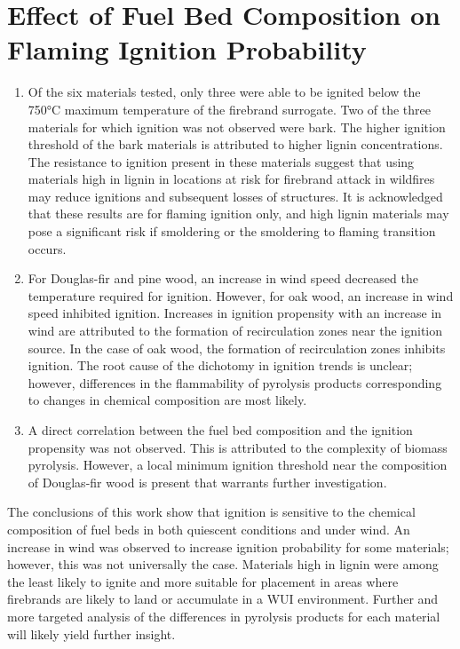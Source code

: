 \section{Effect of Fuel Bed Composition on Flaming Ignition Probability}
        \begin{enumerate}
            \item Of the six materials tested, only three were able to be ignited below the 750\si{\celsius} maximum temperature of the firebrand surrogate. Two of the three materials for which ignition was not observed were bark. The higher ignition threshold of the bark materials is attributed to higher lignin concentrations. The resistance to ignition present in these materials suggest that using materials high in lignin in locations at risk for firebrand attack in wildfires may reduce ignitions and subsequent losses of structures. It is acknowledged that these results are for flaming ignition only, and high lignin materials may pose a significant risk if smoldering or the smoldering to flaming transition occurs.
            
            \item For Douglas-fir and pine wood, an increase in wind speed decreased the temperature required for ignition. However, for oak wood, an increase in wind speed inhibited ignition. Increases in ignition propensity with an increase in wind are attributed to the formation of recirculation zones near the ignition source. In the case of oak wood, the formation of recirculation zones inhibits ignition. The root cause of the dichotomy in ignition trends is unclear; however, differences in the flammability of pyrolysis products corresponding to changes in chemical composition are most likely.
            
            \item A direct correlation between the fuel bed composition and the ignition propensity was not observed. This is attributed to the complexity of biomass pyrolysis. However, a local minimum ignition threshold near the composition of Douglas-fir wood is present that warrants further investigation. 
        \end{enumerate}
    The conclusions of this work show that ignition is sensitive to the chemical composition of fuel beds in both quiescent conditions and under wind. An increase in wind was observed to increase ignition probability for some materials; however, this was not universally the case. Materials high in lignin were among the least likely to ignite and more suitable for placement in areas where firebrands are likely to land or accumulate in a WUI environment. Further and more targeted analysis of the differences in pyrolysis products for each material will likely yield further insight. 

